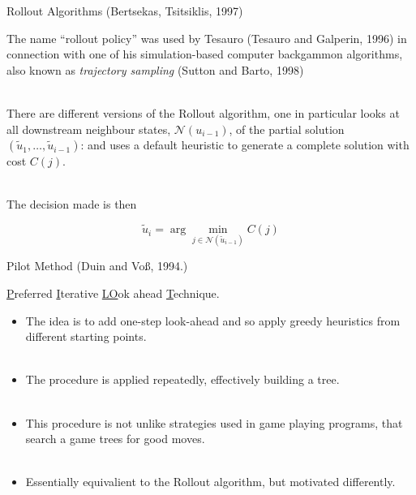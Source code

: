 \documentclass[
	mode=present,
	paper=screen,
	orient=landscape,
	display=slides,
	style=simple
	]{powerdot}
\begin{document}
\begin{slide}{Rollout Algorithms (Bertsekas, Tsitsiklis, 1997)}

The name “rollout policy” was used by Tesauro (Tesauro and Galperin, 1996) in connection with one of his
simulation-based computer backgammon algorithms, also known as \emph{trajectory sampling} (Sutton and Barto, 1998)\\
\ \\
\pause


There are different versions of the Rollout algorithm, one in particular looks at all downstream neighbour states, 
$\mathcal{N}(u_{i-1})$, of the partial solution $(\tilde{u}_1,\ldots,\tilde{u}_{i-1})$: and uses a default heuristic 
to 
generate 
a complete solution with cost $C(j)$. \\
\ \\
\pause

The decision made is then
 
$$\tilde{u}_i=\arg\min_{j\in 
\mathcal{N}(\tilde{u}_{i-1})}C(j)$$


\end{slide}


\begin{slide}{Pilot Method (Duin and Vo\ss, 1994.)}

\underline{P}referred \underline{I}terative \underline{LO}ok ahead \underline{T}echnique.

\begin{itemize}
\item The idea is to add one-step look-ahead and so apply greedy heuristics from different starting points. \\  \ \\
\pause
\item The procedure is applied repeatedly, effectively building a tree. \\ \ \\ \pause
\item This procedure is not unlike strategies used in game playing programs, that search a game trees for good 
moves.\\ \ \\ \pause
\item Essentially equivalient to the Rollout algorithm, but motivated differently.
\end{itemize}

\end{slide}
\end{document}
